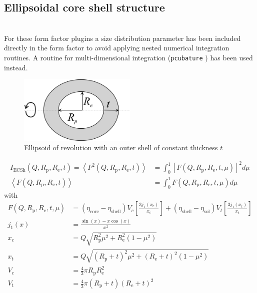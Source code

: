 \subsection{Ellipsoidal core shell structure}
\label{sect:EllipsoidalCoreShell} ~\\
For these form factor plugins a size distribution parameter has been included directly in the form factor to avoid applying nested numerical integration routines. A routine for multi-dimensional integration (\texttt{pcubature} \cite{Johnson2017}) has been used instead.
\begin{figure}[htb]
\begin{center}
\includegraphics[width=0.5\textwidth]{../images/form_factor/Ellipsoid/ellipsoidalShell.png}
\end{center}
\caption{Ellipsoid of revolution with an outer shell of constant thickness $t$} \label{ellipsoidalShell}
\end{figure}
\begin{align}
I_\text{ECSh}(Q,R_\mathrm{p},R_\mathrm{e},t) = \left\langle F^2(Q,R_\mathrm{p},R_\mathrm{e},t) \right\rangle
& = \int_0^1 \left[F(Q,R_\mathrm{p},R_\mathrm{e},t,\mu)\right]^2 d\mu \\
\left\langle F(Q,R_\mathrm{p},R_\mathrm{e},t) \right\rangle & = \int_0^1 F(Q,R_\mathrm{p},R_\mathrm{e},t,\mu)
d\mu
\end{align}
with
\begin{align}
F(Q,R_\mathrm{p},R_\mathrm{e},t,\mu) &= \left(\eta_\text{core}-\eta_\text{shell}\right) V_c\left[
\frac{3j_1(x_c)}{x_c}\right]
          +\left(\eta_\text{shell}-\eta_\text{sol}\right) V_t\left[ \frac{3j_1(x_t)}{x_t}\right]
          \nonumber \\
j_1(x) &= \frac{\sin(x)-x\cos(x)}{x^2} \nonumber \\
x_c &= Q \sqrt{R_\mathrm{p}^2\mu^2+R_\mathrm{e}^2(1-\mu^2)} \nonumber \\
x_t &= Q \sqrt{(R_\mathrm{p}+t)^2\mu^2+(R_\mathrm{e}+t)^2(1-\mu^2)} \nonumber \\
V_c &= \frac{4}{3}\pi R_\mathrm{p}R_\mathrm{e}^2 \nonumber \\
V_t &= \frac{4}{3}\pi (R_\mathrm{p}+t)(R_\mathrm{e}+t)^2 \nonumber
\end{align}
